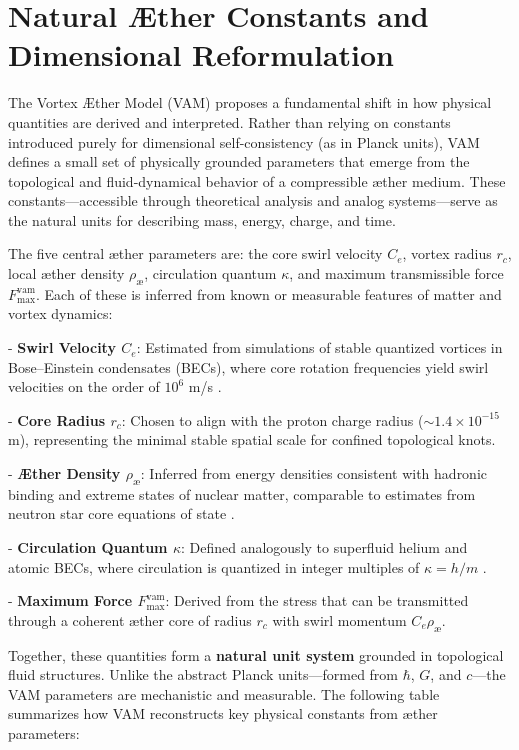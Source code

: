 \section{Natural Æther Constants and Dimensional Reformulation}

The Vortex Æther Model (VAM) proposes a fundamental shift in how physical quantities are derived and interpreted. Rather than relying on constants introduced purely for dimensional self-consistency (as in Planck units), VAM defines a small set of physically grounded parameters that emerge from the topological and fluid-dynamical behavior of a compressible æther medium. These constants—accessible through theoretical analysis and analog systems—serve as the natural units for describing mass, energy, charge, and time.

The five central æther parameters are: the core swirl velocity $C_e$, vortex radius $r_c$, local æther density $\rho_\text{\ae}$, circulation quantum $\kappa$, and maximum transmissible force $F_\text{max}^{\text{vam}}$. Each of these is inferred from known or measurable features of matter and vortex dynamics:

- \textbf{Swirl Velocity $C_e$}: Estimated from simulations of stable quantized vortices in Bose–Einstein condensates (BECs), where core rotation frequencies yield swirl velocities on the order of $10^6$ m/s \cite{Pethick2008BEC, Kleckner2013KnottedVortices}.

- \textbf{Core Radius $r_c$}: Chosen to align with the proton charge radius ($\sim 1.4 \times 10^{-15}$ m), representing the minimal stable spatial scale for confined topological knots.

- \textbf{Æther Density $\rho_\text{\ae}$}: Inferred from energy densities consistent with hadronic binding and extreme states of nuclear matter, comparable to estimates from neutron star core equations of state \cite{Lattimer2016EOS}.

- \textbf{Circulation Quantum $\kappa$}: Defined analogously to superfluid helium and atomic BECs, where circulation is quantized in integer multiples of $\kappa = h/m$ \cite{Donnelly1991QuantizedVortices}.

- \textbf{Maximum Force $F_\text{max}^{\text{vam}}$}: Derived from the stress that can be transmitted through a coherent æther core of radius $r_c$ with swirl momentum $C_e \rho_\text{\ae}$.

Together, these quantities form a \textbf{natural unit system} grounded in topological fluid structures. Unlike the abstract Planck units—formed from $\hbar$, $G$, and $c$—the VAM parameters are mechanistic and measurable. The following table summarizes how VAM reconstructs key physical constants from æther parameters:

